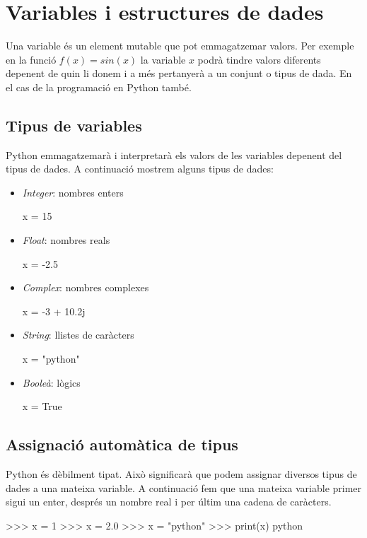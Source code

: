 
\chapter{Variables i estructures de dades}

Una variable és un element mutable que pot emmagatzemar valors. Per exemple en la funció $f(x) = sin(x)$ la variable $x$ podrà tindre valors diferents depenent de quin li donem i a més pertanyerà a un conjunt o tipus de dada. En el cas de la programació en Python també. 

\section{Tipus de variables}

Python emmagatzemarà i interpretarà els valors de les variables depenent del tipus de dades. A continuació mostrem alguns tipus de dades:



\begin{itemize}
	\item \emph{Integer}: nombres enters
	
	x = 15	
	
	\item \emph{Float}: nombres reals

	x = -2.5

	\item \emph{Complex}: nombres complexes
	
	x = -3 + 10.2j
	
	\item \emph{String}: llistes de caràcters
	
	x = "python" 
	
	\item \emph{Booleà}: lògics
	
	x = True
\end{itemize}


\section{Assignació automàtica de tipus}


Python és dèbilment tipat. Això significarà que podem assignar diversos tipus de dades a una mateixa variable. A continuació fem que una mateixa variable primer sigui un enter, després un nombre real i per últim una cadena de caràcters.


\begin{tip}[caption=Variables débilment tipades]
>>> x = 1
>>> x = 2.0
>>> x = "python"
>>> print(x)
python
\end{tip}



